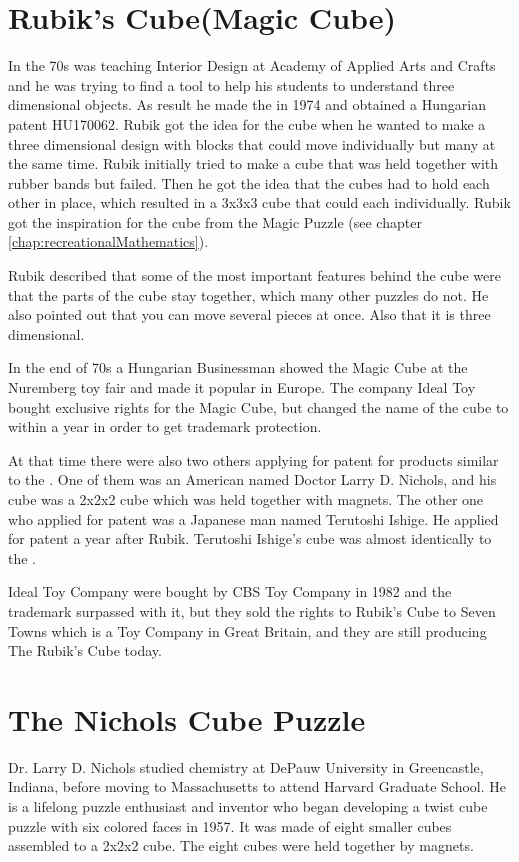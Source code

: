 \section{Rubik's Cube(Magic Cube)}
In the 70s \erno{} was teaching Interior Design at Academy of Applied Arts and Crafts and he was trying to find a tool to help his students to understand three dimensional objects. As result he made the \mcube in 1974 and obtained a Hungarian patent HU170062. 
Rubik got the idea for the cube when he wanted to make a three dimensional design with blocks that could move individually but many at the same time. Rubik initially tried  to make a cube that was held together with rubber bands but failed. Then he got the idea that the cubes had to hold each other in place, which resulted in a 3x3x3 cube that could \twist{} each \face{} individually. Rubik got the inspiration for the cube from the Magic Puzzle (see chapter \ref{chap:recreationalMathematics}).

Rubik described that some of the most important features behind the cube were that the parts of the cube stay together, which many other puzzles do not. He also pointed out that you can move several pieces at once. Also that it is three dimensional. 

In the end of 70s a Hungarian Businessman showed the Magic Cube at the Nuremberg toy fair and made it popular in Europe. The company Ideal Toy bought exclusive rights for the Magic Cube, but changed the name of the cube to \rubik{} within a year in order to get trademark protection.

At that time there were also two others applying for patent for products similar to the \rubik{}.  One of them was an American named Doctor Larry D. Nichols, and his cube was a 2x2x2 cube which was held together with magnets. The other one who applied for patent was a Japanese man named Terutoshi Ishige. He applied for patent a year after Rubik. Terutoshi Ishige's cube was almost identically to the \rubik{}.

Ideal Toy Company were bought by CBS Toy Company in 1982 and the trademark surpassed with it, but they sold the rights to Rubik's Cube to Seven Towns which is a Toy Company in Great Britain, and they are still producing The Rubik's Cube today.

\section{The Nichols Cube Puzzle}
Dr. Larry D. Nichols studied chemistry at DePauw University in Greencastle, Indiana, before moving to Massachusetts to attend Harvard Graduate School. 
He is a lifelong puzzle enthusiast and inventor who  began developing a twist cube puzzle with six colored faces in 1957. It was made of eight smaller cubes assembled to a 2x2x2 cube. The eight cubes were held together by magnets.

